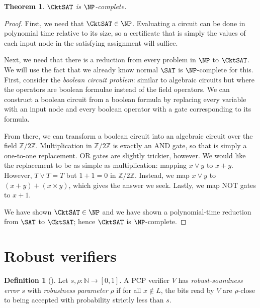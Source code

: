 \documentclass[english,12pt]{reedthesis}
\theoremstyle{plain}
\newtheorem{thm}{Theorem}[section]
\theoremstyle{definition}
\newtheorem{defn}[defn]{Definition}
\theoremstyle{remark}
\begin{document}
\begin{thm}\label{thm:cktsat-np-complete}
  $\CktSAT$ is $\NP$-complete.
\end{thm}

\begin{proof}
  First, we need that $\CktSAT \in \NP$. Evaluating a circuit can be done in
  polynomial time relative to its size, so a certificate that is simply the
  values of each input node in the satisfying assignment will suffice.

  Next, we need that there is a reduction from every problem in $\NP$ to
  $\CktSAT$. We will use the fact that we already know normal $\SAT$ is
  $\NP$-complete for this. First, consider the \emph{boolean circuit problem}:
  similar to algebraic circuits but where the operators are boolean formulae
  instead of the field operators. We can construct a boolean circuit from a
  boolean formula by replacing every variable with an input node and every
  boolean operator with a gate corresponding to its formula.

  From there, we can transform a boolean circuit into an algebraic circuit over
  the field $\mathbb{Z}/2\mathbb{Z}$. Multiplication in $\mathbb{Z}/2\mathbb{Z}$ is exactly an AND gate, so that is
  simply a one-to-one replacement. OR gates are slightly trickier, however. We
  would like the replacement to be as simple as multiplication: mapping $x \vee y$
  to $x + y$. However, $T \vee T = T$ but $1 + 1 = 0$ in $\mathbb{Z}/2\mathbb{Z}$. Instead, we map
  $x \vee y$ to $(x + y) + (x \times y)$, which gives the answer we seek. Lastly, we map
  NOT gates to $x + 1$.

  We have shown $\CktSAT \in \NP$ and we have shown a polynomial-time reduction
  from $\SAT$ to $\CktSAT$; hence $\CktSAT$ is $\NP$-complete.
\end{proof}

\section{Robust verifiers}\label{sec:robust-verifier}

\begin{defn}[{\cite[Def.\ 2.6]{BGHSV06}}]\label{def:robust-verifer}
  Let $s, \rho: \mathbb{N} \rightarrow [0, 1]$. A PCP verifier $V$ has \emph{robust-soundness error}
  $s$ with \emph{robustness parameter} $\rho$ if for all $x \notin L$, the bits read by
  $V$ are $\rho$-close to being accepted with probability strictly less than $s$.
\end{defn}
\end{document}
